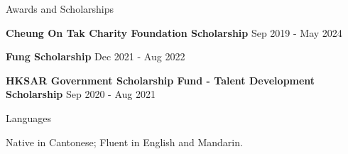 \documentclass{resume}
\begin{document}
\begin{rSection}{Awards and Scholarships}

    {\bf Cheung On Tak Charity Foundation Scholarship} \hfill Sep 2019 - May 2024

    {\bf Fung Scholarship} \hfill Dec 2021 - Aug 2022

    {\bf HKSAR Government Scholarship Fund - Talent Development Scholarship} \hfill Sep 2020 - Aug 2021

\end{rSection}

\begin{rSection}{Languages}

    Native in Cantonese; Fluent in English and Mandarin.

\end{rSection}
\end{document}
